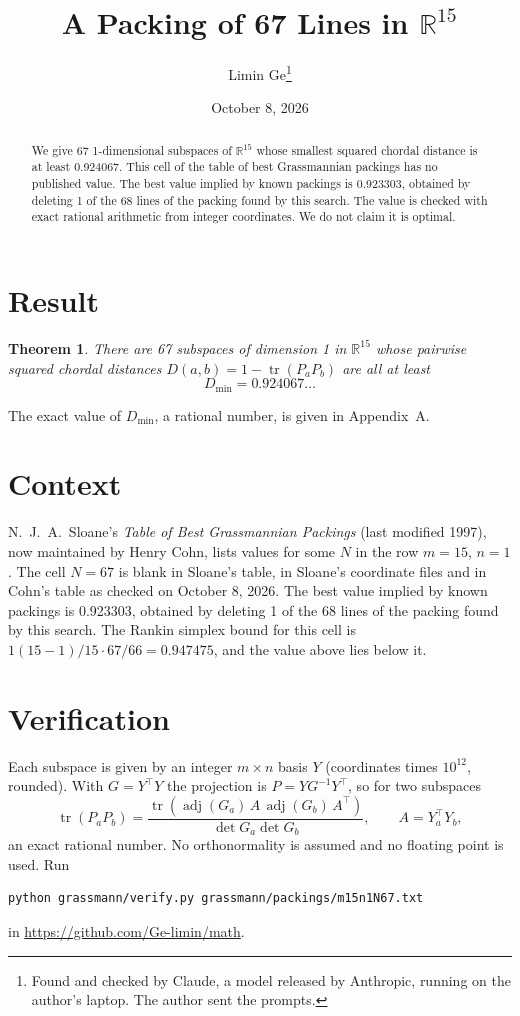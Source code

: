 \documentclass[11pt,a4paper]{article}
\title{A Packing of 67 Lines in $\mathbb{R}^{15}$}
\author{Limin Ge\thanks{Found and checked by Claude, a model released by Anthropic, running on the author's laptop. The author sent the prompts.}}
\date{October 8, 2026}
\newtheorem*{theorem}{Theorem}
\begin{document}
\maketitle
\begin{abstract}
We give 67 1-dimensional subspaces of $\mathbb{R}^{15}$ whose smallest squared chordal distance is at least 0.924067. This cell of the table of best Grassmannian packings has no published value. The best value implied by known packings is 0.923303, obtained by deleting 1 of the 68 lines of the packing found by this search. The value is checked with exact rational arithmetic from integer coordinates. We do not claim it is optimal.
\end{abstract}

\section{Result}
\begin{theorem}
There are 67 subspaces of dimension 1 in $\mathbb{R}^{15}$ whose pairwise squared chordal distances $D(a,b) = 1 - \operatorname{tr}(P_aP_b)$ are all at least
\[ D_{\min} = 0.924067\ldots \]
\end{theorem}
The exact value of $D_{\min}$, a rational number, is given in Appendix~A.


\section{Context}
N.~J.~A.~Sloane's \emph{Table of Best Grassmannian Packings} (last modified 1997), now maintained by Henry Cohn, lists values for some $N$ in the row $m=15$, $n=1$. The cell $N=67$ is blank in Sloane's table, in Sloane's coordinate files and in Cohn's table as checked on October 8, 2026. The best value implied by known packings is 0.923303, obtained by deleting 1 of the 68 lines of the packing found by this search. The Rankin simplex bound for this cell is $1(15-1)/15\cdot 67/66 = 0.947475$, and the value above lies below it.


\section{Verification}
Each subspace is given by an integer $m\times n$ basis $Y$ (coordinates times $10^{12}$, rounded). With $G=Y^\top Y$ the projection is $P=YG^{-1}Y^\top$, so for two subspaces
\[ \operatorname{tr}(P_aP_b)=\frac{\operatorname{tr}(\operatorname{adj}(G_a)\,A\,\operatorname{adj}(G_b)\,A^\top)}{\det G_a\det G_b},\qquad A=Y_a^\top Y_b, \]
an exact rational number. No orthonormality is assumed and no floating point is used. Run
\begin{verbatim}
python grassmann/verify.py grassmann/packings/m15n1N67.txt
\end{verbatim}
in \url{https://github.com/Ge-limin/math}.
\end{document}
